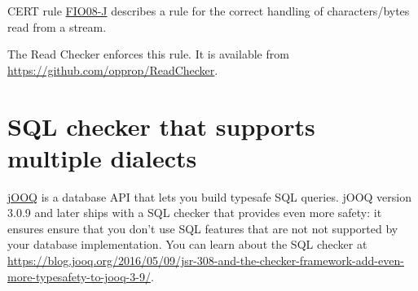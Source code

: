 CERT
rule \href{https://www.securecoding.cert.org/confluence/display/java/FIO08-J.+Distinguish+between+characters+or+bytes+read+from+a+stream+and+-1}{FIO08-J}
describes a rule for the correct handling of characters/bytes read
from a stream.

The Read Checker enforces this rule.
It is available from
\url{https://github.com/opprop/ReadChecker}.


\section{SQL checker that supports multiple dialects\label{sql-schecker}}

\href{http://www.jooq.org/}{jOOQ} is a database API that lets you build
typesafe SQL queries.  jOOQ version 3.0.9 and later ships with a SQL
checker that provides even more safety:  it ensures ensure that you don't
use SQL features that are not not supported by your database
implementation.  You can learn about the SQL checker at
\url{https://blog.jooq.org/2016/05/09/jsr-308-and-the-checker-framework-add-even-more-typesafety-to-jooq-3-9/}.


